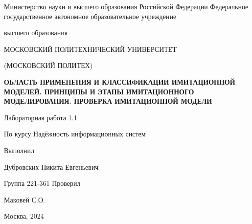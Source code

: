 \singlespacing

\newpage
\begin{center}
    Министерство науки и высшего образования Российской Федерации
    Федеральное государственное автономное образовательное учреждение

    высшего образования

    \guillemotleft МОСКОВСКИЙ ПОЛИТЕХНИЧЕСКИЙ УНИВЕРСИТЕТ\guillemotright

    (МОСКОВСКИЙ ПОЛИТЕХ)
\end{center}
\noindent
\bigbreak
\bigbreak
\bigbreak
\bigbreak
\begin{center}
    \textbf{ОБЛАСТЬ ПРИМЕНЕНИЯ И КЛАССИФИКАЦИИ ИМИТАЦИОННОЙ МОДЕЛЕЙ. ПРИНЦИПЫ И ЭТАПЫ ИМИТАЦИОННОГО МОДЕЛИРОВАНИЯ. ПРОВЕРКА ИМИТАЦИОННОЙ МОДЕЛИ}
    \bigskip
    \bigskip
    \bigskip
    \bigskip
    \bigskip

    Лабораторная работа 1.1

    По курсу \guillemotleft Надёжность информационных систем\guillemotright
    \bigskip

    \bigbreak
    \bigbreak
    \bigbreak
    \bigbreak
\end{center}
\noindent
\bigbreak
\bigbreak
\bigbreak
\bigbreak
\bigbreak
\bigbreak
\bigbreak
\bigbreak
\bigbreak
\bigbreak
\hfill Выполнил

\hfill Дубровских Никита Евгеньевич

\hfill Группа 221-361
\bigbreak
\bigbreak
\bigbreak
\hfill Проверил

\hfill Маковей С.О.
\vfill
\begin{center}
    Москва, 2024
\end{center}
\newpage
\onehalfspacing
